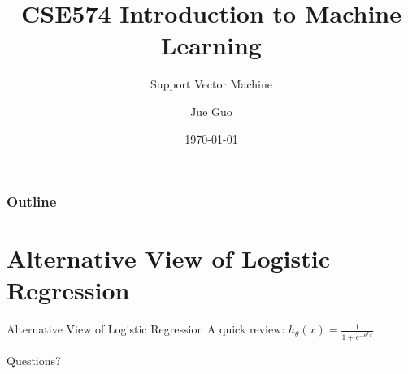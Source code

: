 \documentclass[9pt,dvipsnames]{beamer}
\title{CSE574 Introduction to Machine Learning}
\subtitle{Support Vector Machine}
\author{Jue Guo}
\institute{University at Buffalo}
\date{\today}
\begin{document}
	\begin{frame}
		\titlepage
	\end{frame}
	
	\begin{frame}
		\frametitle{Outline}
		\tableofcontents
	\end{frame}
	\section{Alternative View of Logistic Regression}
	\begin{frame}{Alternative View of Logistic Regression}
		A quick review: $h_\theta(x)=\frac{1}{1+e^{-\theta^T x}}$
	\end{frame}
	
	\begin{frame}
		\begin{center}
			\Huge Questions?
		\end{center}
	\end{frame}
\end{document}
